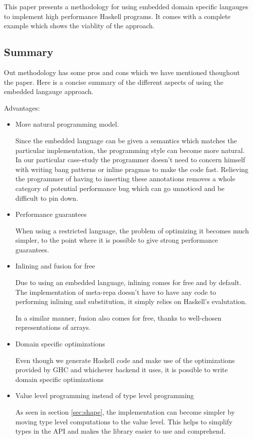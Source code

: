 \documentclass[preprint]{sigplanconf}
\begin{document}
This paper presents a methodology for using embedded domain specific
langauges to implement high performance Haskell programs. It comes with
a complete example which shows the viablity of the approach.

\subsection{Summary}

Out methodology has some pros and cons which we have mentioned thoughout
the paper. Here is a concise summary of the different aspects of using
the embedded langauge approach.

Advantages:

\begin{itemize}
\item
  More natural programming model.

  Since the embedded language can be given a semantics which matches the
  particular implementation, the programming style can become more
  natural. In our particular case-study the programmer doesn't need to
  concern himself with writing bang patterns or inline pragmas to make
  the code fast. Relieving the programmer of having to inserting these
  annotations removes a whole category of potential performance bug
  which can go unnoticed and be difficult to pin down.
\item
  Performance guarantees

  When using a restricted language, the problem of optimizing it becomes
  much simpler, to the point where it is possible to give strong
  performance guarantees.
\item
  Inlining and fusion for free

  Due to using an embedded language, inlining comes for free and by
  default. The implementation of meta-repa doesn't have to have any code
  to performing inlining and substitution, it simply relies on Haskell's
  evalutation.

  In a similar manner, fusion also comes for free, thanks to well-chosen
  representations of arrays.
\item
  Domain specific optimizations

  Even though we generate Haskell code and make use of the optimizations
  provided by GHC and whichever backend it uses, it is possible to write
  domain specific optimizations
\item
  Value level programming instead of type level programming

  As seen in section \ref{sec:shape}, the implementation can become
  simpler by moving type level computations to the value level. This
  helps to simplify types in the API and makes the library easier to use
  and comprehend.
\end{itemize}
\end{document}
